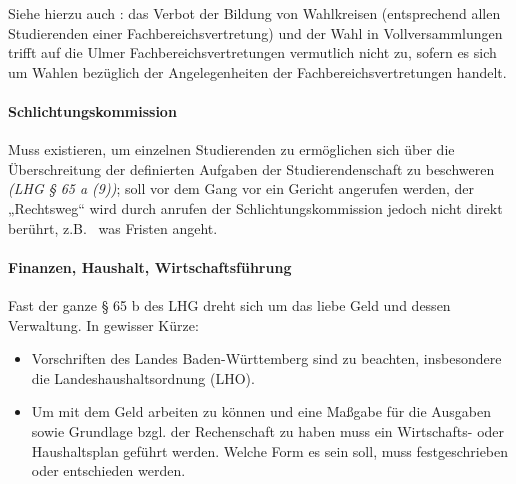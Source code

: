 \documentclass[
10pt,
a4paper,
twoside,								%
titlepage=false,							%
draft=false								%
]{scrartcl}
\begin{document}
Siehe hierzu auch : das Verbot der Bildung von Wahlkreisen (entsprechend allen Studierenden einer Fachbereichsvertretung) und der Wahl in Vollversammlungen trifft auf die Ulmer Fachbereichsvertretungen vermutlich nicht zu, sofern es sich um Wahlen bezüglich der Angelegenheiten der Fachbereichsvertretungen handelt.




\paragraph{Schlichtungskommission}

Muss existieren, um einzelnen Studierenden zu ermöglichen sich über die Überschreitung der definierten Aufgaben der Studierendenschaft zu beschweren \textit{(LHG § 65 a (9))}; soll vor dem Gang vor ein Gericht angerufen werden, der „Rechtsweg“ wird durch anrufen der Schlichtungskommission jedoch nicht direkt berührt, z.B.~ was Fristen angeht.



\paragraph{Finanzen, Haushalt, Wirtschaftsführung\label{Glossar:Finanzen, Haushalt, Wirtschaftsführung}}

Fast der ganze § 65 b des LHG dreht sich um das liebe Geld und dessen Verwaltung. In gewisser Kürze:
\begin{itemize}
	\item Vorschriften des Landes Baden-Württemberg sind zu beachten, insbesondere die Landeshaushaltsordnung (LHO).
	\item Um mit dem Geld arbeiten zu können und eine Maßgabe für die Ausgaben sowie Grundlage bzgl. der Rechenschaft zu haben muss ein Wirtschafts- oder Haushaltsplan geführt werden. Welche Form es sein soll, muss festgeschrieben oder entschieden werden.
\end{itemize}
\end{document}
